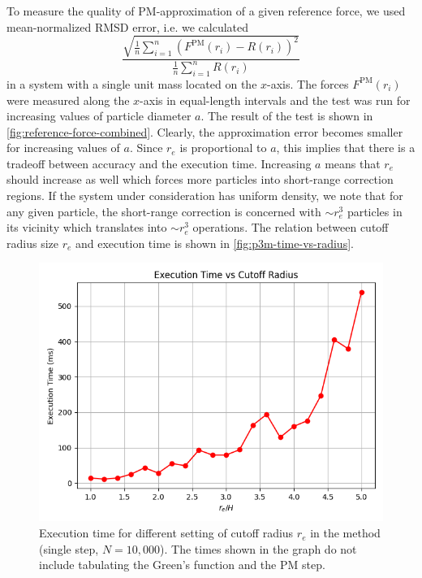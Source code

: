 To measure the quality of PM-approximation of a given reference force, we used mean-normalized RMSD error, i.e. we calculated
\begin{equation*}
    \frac{\sqrt{\frac{1}{n} \sum_{i=1}^{n} (F^\text{PM}(r_i) - R(r_i))^2}}{\frac{1}{n} \sum_{i=1}^{n} R(r_i)}
\end{equation*}
in a system with a single unit mass located on the $x$-axis.
The forces $F^\text{PM}(r_i)$ were measured along the $x$-axis in equal-length intervals and the test was run for increasing values of particle diameter $a$.
The result of the test is shown in \autoref{fig:reference-force-combined}.
Clearly, the approximation error becomes smaller for increasing values of $a$.
Since $r_e$ is proportional to $a$, this implies that there is a tradeoff between accuracy and the execution time.
Increasing $a$ means that $r_e$ should increase as well which forces more particles into short-range correction regions.
If the system under consideration has uniform density, we note that for any given particle, the short-range correction is concerned with $\sim r_e^3$ particles in its vicinity which translates into $\sim r_e^3$ operations.
The relation between cutoff radius size $r_e$ and execution time is shown in \autoref{fig:p3m-time-vs-radius}.
\begin{figure}[htp]
    \centering
    \includegraphics[scale=0.5]{chapters/p3m-method/img/time-vs-radius.png}
    \caption{Execution time for different setting of cutoff radius $r_e$ in the \PThreeM{} method (single step, $N=10{,}000$).
    The times shown in the graph do not include tabulating the Green's function and the PM step.}
    \label{fig:p3m-time-vs-radius}
\end{figure}
